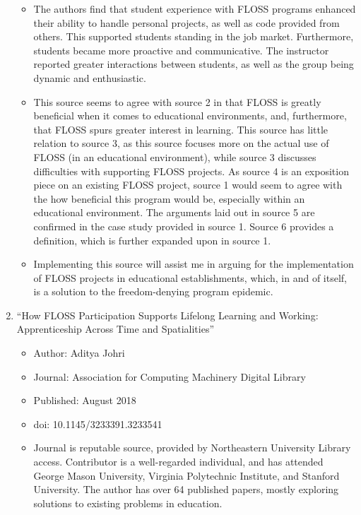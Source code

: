 \begin{enumerate}
\begin{itemize}
      \item The authors find that student experience with FLOSS programs enhanced their ability to handle personal projects, as well as code provided from others. This supported students standing in the job market. Furthermore, students became more proactive and communicative. The instructor reported greater interactions between students, as well as the group being dynamic and enthusiastic.

      \item This source seems to agree with source 2 in that FLOSS is greatly beneficial when it comes to educational environments, and, furthermore, that FLOSS spurs greater interest in learning. This source has little relation to source 3, as this source focuses more on the actual use of FLOSS (in an educational environment), while source 3 discusses difficulties with supporting FLOSS projects. As source 4 is an exposition piece on an existing FLOSS project, source 1 would seem to agree with the how beneficial this program would be, especially within an educational environment. The arguments laid out in source 5 are confirmed in the case study provided in source 1. Source 6 provides a definition, which is further expanded upon in source 1.

      \item Implementing this source will assist me in arguing for the implementation of FLOSS projects in educational establishments, which, in and of itself, is a solution to the freedom-denying program epidemic.

    \end{itemize}

  \item ``How FLOSS Participation Supports Lifelong Learning and Working: Apprenticeship Across Time and Spatialities''

    \begin{itemize}

      \item Author: Aditya Johri

      \item Journal: Association for Computing Machinery Digital Library

      \item Published: August 2018

      \item doi: 10.1145/3233391.3233541

      \item Journal is reputable source, provided by Northeastern University Library access. Contributor is a well-regarded individual, and has attended George Mason University, Virginia Polytechnic Institute, and Stanford University. The author has over 64 published papers, mostly exploring solutions to existing problems in education.


\end{itemize}
\end{enumerate}
